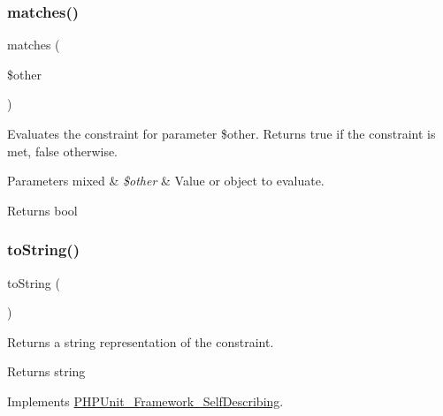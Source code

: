 \subsubsection{\texorpdfstring{matches()}{matches()}}
{\footnotesize\ttfamily matches (\begin{DoxyParamCaption}\item[{}]{\$other }\end{DoxyParamCaption})\hspace{0.3cm}{\ttfamily [protected]}}

Evaluates the constraint for parameter \$other. Returns true if the constraint is met, false otherwise.


\begin{DoxyParams}[1]{Parameters}
mixed & {\em \$other} & Value or object to evaluate.\\
\hline
\end{DoxyParams}
\begin{DoxyReturn}{Returns}
bool 
\end{DoxyReturn}
\mbox{\label{class_p_h_p_unit___framework___constraint___class_has_attribute_a5558c5d549f41597377fa1ea8a1cefa3}} 
\subsubsection{\texorpdfstring{to\+String()}{toString()}}
{\footnotesize\ttfamily to\+String (\begin{DoxyParamCaption}{ }\end{DoxyParamCaption})}

Returns a string representation of the constraint.

\begin{DoxyReturn}{Returns}
string 
\end{DoxyReturn}


Implements \mbox{\hyperlink{interface_p_h_p_unit___framework___self_describing_a5558c5d549f41597377fa1ea8a1cefa3}{P\+H\+P\+Unit\+\_\+\+Framework\+\_\+\+Self\+Describing}}.



